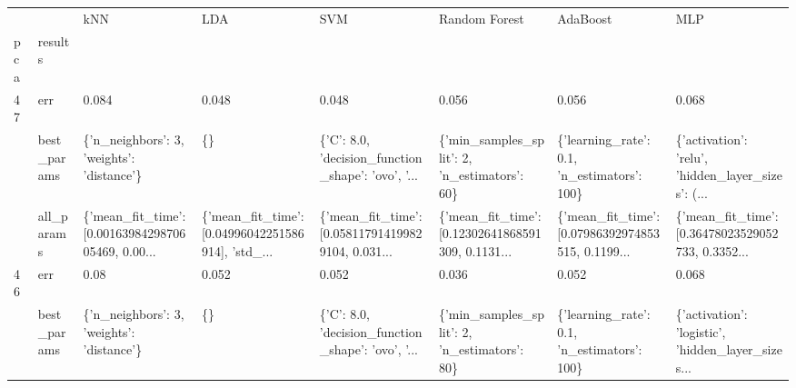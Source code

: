 \begin{tabular}{llllllll}
\toprule
   &            &                                                kNN &                                                LDA &                                                SVM &                                      Random Forest &                                           AdaBoost &                                                MLP \\
pca & results &                                                    &                                                    &                                                    &                                                    &                                                    &                                                    \\
\midrule
47 & err &                                              0.084 &                                              0.048 &                                              0.048 &                                              0.056 &                                              0.056 &                                              0.068 \\
   & best\_params &          \{'n\_neighbors': 3, 'weights': 'distance'\} &                                                 \{\} &  \{'C': 8.0, 'decision\_function\_shape': 'ovo', '... &       \{'min\_samples\_split': 2, 'n\_estimators': 60\} &        \{'learning\_rate': 0.1, 'n\_estimators': 100\} &  \{'activation': 'relu', 'hidden\_layer\_sizes': (... \\
   & all\_params &  \{'mean\_fit\_time': [0.0016398429870605469, 0.00... &  \{'mean\_fit\_time': [0.04996042251586914], 'std\_... &  \{'mean\_fit\_time': [0.058117914199829104, 0.031... &  \{'mean\_fit\_time': [0.12302641868591309, 0.1131... &  \{'mean\_fit\_time': [0.07986392974853515, 0.1199... &  \{'mean\_fit\_time': [0.36478023529052733, 0.3352... \\
46 & err &                                               0.08 &                                              0.052 &                                              0.052 &                                              0.036 &                                              0.052 &                                              0.068 \\
   & best\_params &          \{'n\_neighbors': 3, 'weights': 'distance'\} &                                                 \{\} &  \{'C': 8.0, 'decision\_function\_shape': 'ovo', '... &       \{'min\_samples\_split': 2, 'n\_estimators': 80\} &        \{'learning\_rate': 0.1, 'n\_estimators': 100\} &  \{'activation': 'logistic', 'hidden\_layer\_sizes... \\

\end{tabular}
